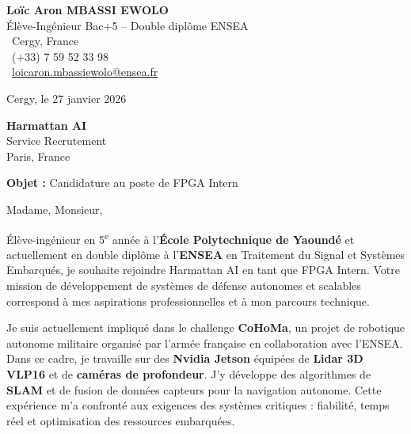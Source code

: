 \documentclass[a4paper,11pt]{article}
\begin{document}
\noindent
\begin{minipage}[t]{0.5\textwidth}
    \textbf{Loïc Aron MBASSI EWOLO}\\
    Élève-Ingénieur Bac+5 -- Double diplôme ENSEA\\[3pt]
    \faMapMarker\ Cergy, France\\
    \faPhone\ (+33) 7 59 52 33 98\\
    \faEnvelope\ \href{mailto:loicaron.mbassiewolo@ensea.fr}{loicaron.mbassiewolo@ensea.fr}
\end{minipage}
\hfill
\begin{minipage}[t]{0.4\textwidth}
    \raggedleft
    Cergy, le 27 janvier 2026
\end{minipage}

\vspace{1.2cm}

\hfill
\begin{minipage}[t]{0.5\textwidth}
    \raggedleft
    \textbf{Harmattan AI}\\
    Service Recrutement\\
    Paris, France
\end{minipage}

\vspace{1cm}

\noindent\textbf{Objet :} Candidature au poste de FPGA Intern

\vspace{0.8cm}

Madame, Monsieur,

Élève-ingénieur en 5\textsuperscript{e} année à l'\textbf{École Polytechnique de Yaoundé} et actuellement en double diplôme à l'\textbf{ENSEA} en Traitement du Signal et Systèmes Embarqués, je souhaite rejoindre Harmattan AI en tant que FPGA Intern. Votre mission de développement de systèmes de défense autonomes et scalables correspond à mes aspirations professionnelles et à mon parcours technique.

Je suis actuellement impliqué dans le challenge \textbf{CoHoMa}, un projet de robotique autonome militaire organisé par l'armée française en collaboration avec l'ENSEA. Dans ce cadre, je travaille sur des \textbf{Nvidia Jetson} équipées de \textbf{Lidar 3D VLP16} et de \textbf{caméras de profondeur}. J'y développe des algorithmes de \textbf{SLAM} et de fusion de données capteurs pour la navigation autonome. Cette expérience m'a confronté aux exigences des systèmes critiques : fiabilité, temps réel et optimisation des ressources embarquées.
\end{document}
